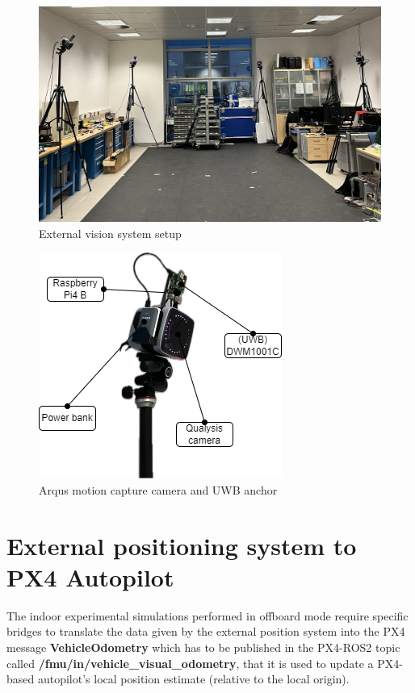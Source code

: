 \documentclass[journal]{IEEEtran}
\begin{document}
\begin{figure}
    \centering
    \includegraphics[scale=0.07]{Images/env.JPG}
    \caption{External vision system setup}
    \label{fig:env_hardware}
\end{figure}

\begin{figure}
    \centering
    \includegraphics[scale=0.5]{Images/mocap_uwb_hardware_foto.png}
    \caption{Arqus motion capture camera and UWB anchor}
    \label{fig:vision_system}
\end{figure}

\section{External positioning system to PX4 Autopilot}
\label{bridges}

The indoor experimental simulations performed in offboard mode require specific bridges to translate the data given by the external position system into the PX4 message \textbf{VehicleOdometry} \cite{VehicleOdometry} which has to be published in the PX4-ROS2 topic called \textbf{/fmu/in/vehicle\_visual\_odometry}, that it is used to update a PX4-based autopilot's local position estimate (relative to the local origin).
\end{document}
